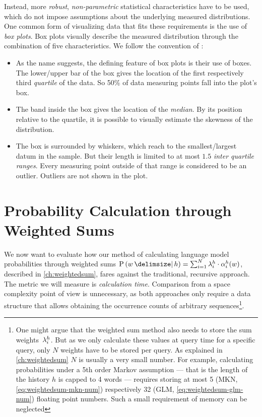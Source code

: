 Instead, more \emph{robust}, \emph{non-parametric} statistical characteristics
have to be used, which do not impose assumptions about the underlying
measured distributions.
One common form of visualizing data that fits these requirements is the use of
\emph{box plots}.
Box plots visually describe the measured distribution through the combination of
five characteristics.
We follow the convention of \textcite{Tukey1977}:
\begin{itemize}
  \item As the name suggests, the defining feature of box plots is their use of
    boxes.
    The lower/upper bar of the box gives the location of the first
    respectively third \emph{quartile} of the data.
    So 50\% of data measuring points fall into the plot's box.
  \item The band inside the box gives the location of the \emph{median}.
    By its position relative to the quartile, it is possible to visually estimate
    the skewness of the distribution.
  \item The box is surrounded by whiskers, which reach to the smallest/largest
    datum in the sample.
    But their length is limited to at most $1.5$ \emph{inter quartile ranges}.
    Every measuring point outside of that range is considered to be an outlier.
    Outliers are not shown in the plot.
\end{itemize}

\section{Probability Calculation through Weighted Sums}
\label{sec:evaluation-weightedsum}

We now want to evaluate how our method of calculating language model
probabilities through weighted sums
\mbox{$\Prob{w}{h} = \sum_{i = 1}^{N} \SumWeight^h_i \cdot \SumArg_i^h(w)$},
described in \cref{ch:weightedsum}, fares against the traditional, recursive
approach.
The metric we will measure is \emph{calculation time}.
Comparison from a space complexity point of view is unnecessary, as both
approaches only require a data structure that allows obtaining the occurrence
counts of arbitrary sequences\footnote{One might argue that the weighted sum
method also needs to store the sum weights~$\lambda^h_i$. But as we only
calculate these values at query time for a specific query, only $N$ weights have
to be stored per query. As explained in \cref{ch:weightedsum} $N$ is usually a
very small number. For example, calculating probabilities under a 5th order
Markov assumption --- that is the length of the history $h$ is capped to 4 words
--- requires storing at most 5 (MKN, \cref{eq:weightedsum-mkn-num}) respectively
32 (GLM, \cref{eq:weightedsum-glm-num}) floating point numbers.
Such a small requirement of memory can be neglected}.

